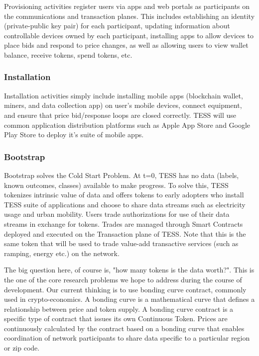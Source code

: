 Provisioning activities register users via apps and web portals as participants on the communications and transaction planes. This includes establishing an identity (private-public key pair) for each participant, updating information about controllable devices owned by each participant, installing apps to allow devices to place bids and respond to price changes, as well as allowing users to view wallet balance, receive tokens, spend tokens, etc. 

\subsubsection{Installation}

Installation activities simply include installing mobile apps (blockchain wallet, miners, and data collection app) on user's mobile devices, connect equipment, and ensure that price bid/response loops are closed correctly. TESS will use common application distribution platforms such as Apple App Store and Google Play Store to deploy it's suite of mobile apps.  

\subsubsection{Bootstrap}

Bootstrap solves the Cold Start Problem. At t=0, TESS has no data (labels, known outcomes, classes) available to make progress. To solve this, TESS tokenizes intrinsic value of data and offers tokens to early adopters who install TESS suite of applications and choose to share data streams such as electricity usage and urban mobility. Users trade authorizations for use of their data streams in exchange for tokens. Trades are managed through Smart Contracts deployed and executed on the Transaction plane of TESS. Note that this is the same token that will be used to trade value-add transactive services (such as ramping, energy etc.) on the network. 

The big question here, of course is, "how many tokens is the data worth?". This is the one of the core research problems we hope to address during the course of development. Our current thinking is to use bonding curve contract, commonly used in crypto-economics. A bonding curve is a mathematical curve that defines a relationship between price and token supply. A bonding curve contract is a specific type of contract that issues its own Continuous Token. Prices are continuously calculated by the contract based on a bonding curve that enables coordination of network participants to share data specific to a particular region or zip code. 

